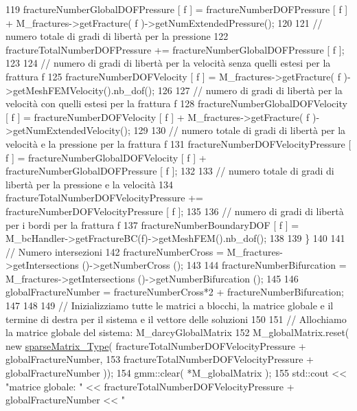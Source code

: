 \begin{DoxyCode}
119         fractureNumberGlobalDOFPressure [ f ] = fractureNumberDOFPressure [ f ] + M\_fractures->getFracture(
       f )->getNumExtendedPressure();
120 
121         \textcolor{comment}{// numero totale di gradi di libertà per la pressione}
122         fractureTotalNumberDOFPressure += fractureNumberGlobalDOFPressure [ f ];
123 
124         \textcolor{comment}{// numero di gradi di libertà per la velocità senza quelli estesi per la frattura f}
125         fractureNumberDOFVelocity [ f ] = M\_fractures->getFracture( f )->getMeshFEMVelocity().nb\_dof();
126 
127         \textcolor{comment}{// numero di gradi di libertà per la velocità con quelli estesi per la frattura f}
128         fractureNumberGlobalDOFVelocity [ f ] = fractureNumberDOFVelocity [ f ] + M\_fractures->getFracture(
       f )->getNumExtendedVelocity();
129 
130         \textcolor{comment}{// numero totale di gradi di libertà per la velocità e la pressione per la frattura f}
131         fractureNumberDOFVelocityPressure [ f ] = fractureNumberGlobalDOFVelocity [ f ] + 
      fractureNumberGlobalDOFPressure [ f ];
132 
133         \textcolor{comment}{// numero totale di gradi di libertà per la pressione e la velocità}
134         fractureTotalNumberDOFVelocityPressure += fractureNumberDOFVelocityPressure [ f ];
135 
136         \textcolor{comment}{// numero di gradi di libertà per i bordi per la frattura f}
137         fractureNumberBoundaryDOF [ f ] = M\_bcHandler->getFractureBC(f)->getMeshFEM().nb\_dof();
138 
139     \}
140 
141     \textcolor{comment}{// Numero intersezioni}
142     fractureNumberCross = M\_fractures->getIntersections ()->getNumberCross ();
143            
144     fractureNumberBifurcation = M\_fractures->getIntersections ()->getNumberBifurcation ();
145     
146     globalFractureNumber = fractureNumberCross*2 + fractureNumberBifurcation;
147     
148 
149     \textcolor{comment}{// Inizializziamo tutte le matrici a blocchi, la matrice globale e il termine di destra per il sistema
       e il vettore delle soluzioni }
150     
151     \textcolor{comment}{// Allochiamo la matrice globale del sistema:  M\_darcyGlobalMatrix}
152     M\_globalMatrix.reset( \textcolor{keyword}{new} \hyperlink{Core_8h_afba9f623673e2ae32054015bdb5500f9}{sparseMatrix\_Type}( fractureTotalNumberDOFVelocityPressure + 
      globalFractureNumber,
153                                                  fractureTotalNumberDOFVelocityPressure + 
      globalFractureNumber ));
154     gmm::clear( *M\_globalMatrix );
155     std::cout << \textcolor{stringliteral}{"matrice globale: "} <<  fractureTotalNumberDOFVelocityPressure + globalFractureNumber << \textcolor{stringliteral}{"
}
\end{DoxyCode}
